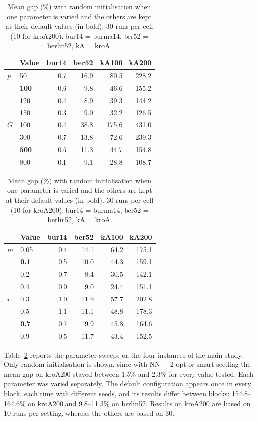 \documentclass[11pt,a4paper]{article}
\begin{document}
\begin{table}[H]
\centering
\caption{Mean gap (\%) with random initialisation when one parameter is varied
and the others are kept at their default values (in bold). 30 runs per cell
(10 for kroA200). bur14 = burma14, ber52 = berlin52, kA = kroA.}
\label{tab:sweep}
\footnotesize
\setlength{\tabcolsep}{3.5pt}
\begin{minipage}[t]{0.49\textwidth}
\centering
\begin{tabular}{llrrrr}
\toprule
 & Value & bur14 & ber52 & kA100 & kA200 \\
\midrule
$p$ & 50 & 0.7 & 16.9 & 80.5 & 228.2 \\
 & \textbf{100} & 0.6 & 9.8 & 46.6 & 155.2 \\
 & 120 & 0.4 & 8.9 & 39.3 & 144.2 \\
 & 150 & 0.3 & 9.0 & 32.2 & 126.5 \\
\midrule
$G$ & 100 & 0.4 & 38.8 & 175.6 & 431.0 \\
 & 300 & 0.7 & 13.8 & 72.6 & 239.3 \\
 & \textbf{500} & 0.6 & 11.3 & 44.7 & 154.8 \\
 & 800 & 0.1 & 9.1 & 28.8 & 108.7 \\
\bottomrule
\end{tabular}
\end{minipage}\hfill
\begin{minipage}[t]{0.49\textwidth}
\centering
\begin{tabular}{llrrrr}
\toprule
 & Value & bur14 & ber52 & kA100 & kA200 \\
\midrule
$m$ & 0.05 & 0.4 & 14.1 & 64.2 & 175.1 \\
 & \textbf{0.1} & 0.5 & 10.0 & 44.3 & 159.1 \\
 & 0.2 & 0.7 & 8.4 & 30.5 & 142.1 \\
 & 0.4 & 0.0 & 9.0 & 24.4 & 151.1 \\
\midrule
$r$ & 0.3 & 1.0 & 11.9 & 57.7 & 202.8 \\
 & 0.5 & 1.1 & 11.1 & 48.8 & 178.3 \\
 & \textbf{0.7} & 0.7 & 9.9 & 45.8 & 164.6 \\
 & 0.9 & 0.5 & 11.7 & 43.4 & 152.5 \\
\bottomrule
\end{tabular}
\end{minipage}
\end{table}

Table~\ref{tab:sweep} reports the parameter sweeps on the four instances of the
main study. Only random initialisation is shown, since with NN + 2-opt or
smart seeding the mean gap on kroA200 stayed between 1.5\% and 2.3\% for
every value tested. Each parameter was varied separately. The default
configuration appears once in every block, each time with different seeds, and
its results differ between blocks: 154.8--164.6\% on kroA200 and 9.8--11.3\% on
berlin52. Results on kroA200 are based on 10 runs per setting, whereas the
others are based on 30.
\end{document}
